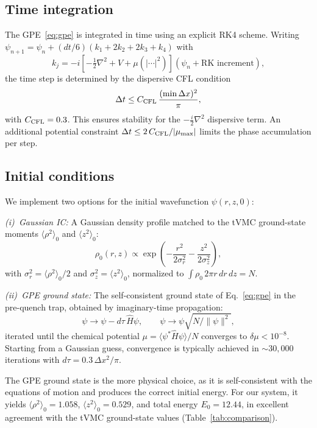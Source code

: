 \documentclass[twocolumn,superscriptaddress,aps,pra,longbibliography]{revtex4-2}
\newcommand{\avg}[1]{\langle #1 \rangle}
\begin{document}
\subsection{Time integration}

The GPE~\eqref{eq:gpe} is integrated in time using an explicit RK4
scheme.  Writing $\psi_{n+1} = \psi_n + (dt/6)(k_1 + 2k_2 + 2k_3 + k_4)$
with
\begin{equation}
k_j = -i\!\left[-\tfrac{1}{2}\nabla^2 + V + \mu(|\cdots|^2)\right]
(\psi_n + \text{RK increment}),
\end{equation}
the time step is determined by the dispersive CFL condition
\begin{equation}
\Delta t \leq C_{\rm CFL}\,\frac{(\min\Delta x)^2}{\pi},
\label{eq:cfl}
\end{equation}
with $C_{\rm CFL} = 0.3$.  This ensures stability for the $-\frac{i}{2}\nabla^2$
dispersive term.  An additional potential constraint
$\Delta t \leq 2\,C_{\rm CFL}/|\mu_{\max}|$ limits the phase
accumulation per step.

\subsection{Initial conditions}

We implement two options for the initial wavefunction $\psi(r,z,0)$:

\emph{(i)~Gaussian IC:}
A Gaussian density profile matched to the tVMC ground-state moments
$\avg{\rho^2}_0$ and $\avg{z^2}_0$:
\begin{equation}
\rho_0(r,z) \propto \exp\!\left(-\frac{r^2}{2\sigma_r^2}
- \frac{z^2}{2\sigma_z^2}\right),
\end{equation}
with $\sigma_r^2 = \avg{\rho^2}_0/2$ and $\sigma_z^2 = \avg{z^2}_0$,
normalized to $\int\rho_0\,2\pi r\,dr\,dz = N$.

\emph{(ii)~GPE ground state:}
The self-consistent ground state of Eq.~\eqref{eq:gpe} in the
pre-quench trap, obtained by imaginary-time propagation:
\begin{equation}
\psi \to \psi - d\tau\,\hat{H}\psi, \qquad
\psi \to \psi\sqrt{N/\|\psi\|^2},
\end{equation}
iterated until the chemical potential $\mu = \avg{\psi^*\hat{H}\psi}/N$
converges to $\delta\mu < 10^{-8}$.  Starting from a Gaussian guess,
convergence is typically achieved in $\sim 30{,}000$ iterations with
$d\tau = 0.3\,\Delta x^2/\pi$.

The GPE ground state is the more physical choice, as it is self-consistent
with the equations of motion and produces the correct initial energy.
For our system, it yields $\avg{\rho^2}_0 = 1.058$, $\avg{z^2}_0 = 0.529$,
and total energy $E_0 = 12.44$, in excellent agreement with the tVMC
ground-state values (Table~\ref{tab:comparison}).
\end{document}
